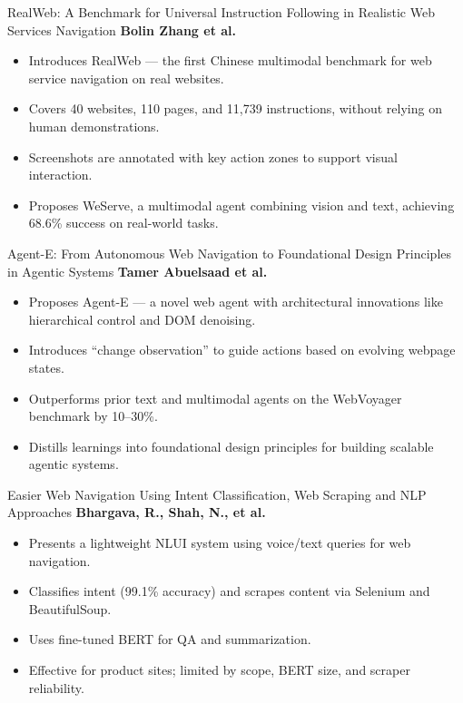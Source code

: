 \documentclass{beamer}
\begin{document}
\begin{frame}{RealWeb: A Benchmark for Universal Instruction
 Following in Realistic Web Services Navigation }
\large\textbf{Bolin Zhang et al.}

\normalsize
\begin{itemize}
  \item Introduces RealWeb — the first Chinese multimodal benchmark for web service navigation on real websites.
  \item Covers 40 websites, 110 pages, and 11,739 instructions, without relying on human demonstrations.
  \item Screenshots are annotated with key action zones to support visual interaction.
  \item Proposes WeServe, a multimodal agent combining vision and text, achieving 68.6\% success on real-world tasks.
\end{itemize}
\end{frame}


\begin{frame}{Agent-E: From Autonomous Web Navigation to Foundational Design Principles in Agentic Systems }
\large\textbf{Tamer Abuelsaad et al.}

\normalsize
\begin{itemize}
  \item Proposes Agent-E — a novel web agent with architectural innovations like hierarchical control and DOM denoising.
  \item Introduces “change observation” to guide actions based on evolving webpage states.
  \item Outperforms prior text and multimodal agents on the WebVoyager benchmark by 10–30\%.
  \item Distills learnings into foundational design principles for building scalable agentic systems.
\end{itemize}
\end{frame}

\begin{frame}{Easier Web Navigation Using Intent 
Classification, Web Scraping and NLP Approaches  }
\large\textbf{Bhargava, R., Shah, N., et al.}

\normalsize
\begin{itemize}
  \item Presents a lightweight NLUI system using voice/text queries for web navigation.
  \item Classifies intent (99.1\% accuracy) and scrapes content via Selenium and BeautifulSoup.
  \item Uses fine-tuned BERT for QA and summarization.
  \item Effective for product sites; limited by scope, BERT size, and scraper reliability.
\end{itemize}
\end{frame}
\end{document}
